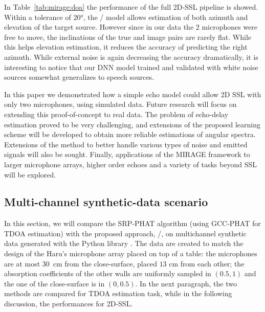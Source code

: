 \mynewline
In Table~\cref{tab:mirage:doa} the performance of the full 2D-SSL pipeline is showed.
Within a tolerance of $\ang{20}$, the \MIRAGE/ model allows estimation of both azimuth and elevation of the target source.
However since in our data the 2 microphones were free to move, the inclinations of the true and image pairs are rarely flat.
While this helps elevation estimation, it reduces the accuracy of predicting the right azimuth.
While external noise is again decreasing the accuracy dramatically,
it is interesting to notice that our \ac{DNN} model trained and validated with white noise sources somewhat generalizes to speech sources.

\mynewline
In this paper we demonstrated how a simple echo model could allow 2D SSL with only two microphones, using simulated data.
Future research will focus on extending this proof-of-concept to real data.
The problem of echo-delay estimation proved to be very challenging, and extensions of the proposed learning scheme will be developed to obtain more reliable estimations of angular spectra.
Extensions of the method to better handle various types of noise and emitted signals will also be sought.
Finally, applications of the MIRAGE framework to larger microphone arrays, higher order echoes and a variety of tasks beyond SSL will be explored.


\subsection{Multi-channel synthetic-data scenario}
In this section, we will compare the \ac{SRP-PHAT} algorithm (using GCC-PHAT for TDOA estimation) with the proposed approach, \MIRAGE/, on multichannel synthetic data generated with the Python library \href{https://github.com/LCAV/pyroomacoustics}.
The data are created to match the design of the Haru's microphone array placed on top of a table:
the microphones are at most 30~cm from the close-surface, placed $13$ cm from each other; the absorption coefficients of the other walls are uniformly sampled in $(0.5, 1)$ and the one of the close-surface is in $(0, 0.5)$.
In the next paragraph, the two methods are compared for \ac{TDOA} estimation task, while in the following discussion, the performances for 2D-\ac{SSL}.

